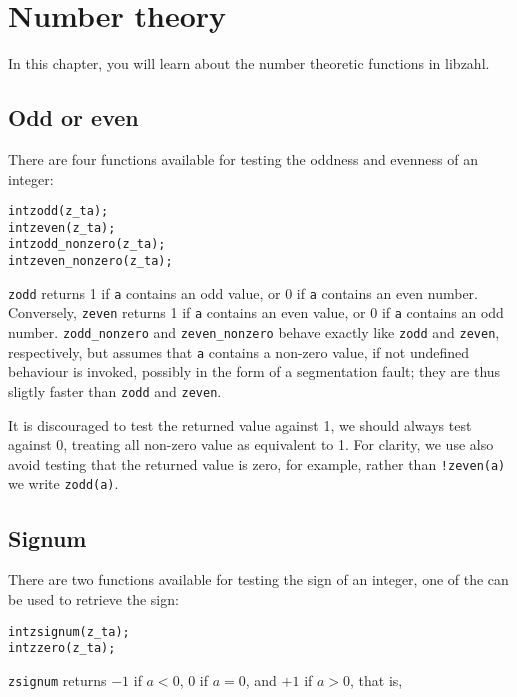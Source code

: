 \chapter{Number theory}
\label{chap:Number theory}

In this chapter, you will learn about the
number theoretic functions in libzahl.

\vspace{1cm}
\minitoc


\newpage
\section{Odd or even}
\label{sec:Odd or even}

There are four functions available for testing
the oddness and evenness of an integer:

\begin{alltt}
   int zodd(z_t a);
   int zeven(z_t a);
   int zodd_nonzero(z_t a);
   int zeven_nonzero(z_t a);
\end{alltt}

\noindent
{\tt zodd} returns 1 if {\tt a} contains an
odd value, or 0 if {\tt a} contains an even
number. Conversely, {\tt zeven} returns 1 if
{\tt a} contains an even value, or 0 if {\tt a}
contains an odd number. {\tt zodd\_nonzero} and
{\tt zeven\_nonzero} behave exactly like {\tt zodd}
and {\tt zeven}, respectively, but assumes that
{\tt a} contains a non-zero value, if not
undefined behaviour is invoked, possibly in the
form of a segmentation fault; they are thus
sligtly faster than {\tt zodd} and {\tt zeven}.

It is discouraged to test the returned value
against 1, we should always test against 0,
treating all non-zero value as equivalent to 1.
For clarity, we use also avoid testing that
the returned value is zero, for example, rather
than {\tt !zeven(a)} we write {\tt zodd(a)}.


\newpage
\section{Signum}
\label{sec:Signum}

There are two functions available for testing
the sign of an integer, one of the can be used
to retrieve the sign:

\begin{alltt}
   int zsignum(z_t a);
   int zzero(z_t a);
\end{alltt}

\noindent
{\tt zsignum} returns $-1$ if $a < 0$,
$0$ if $a = 0$, and $+1$ if $a > 0$, that is,

